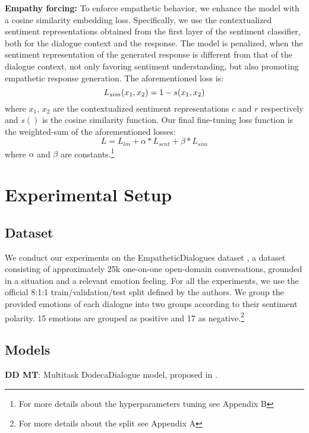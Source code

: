 \documentclass[11pt]{article}
\begin{document}
\textbf{Empathy forcing:} To enforce empathetic behavior, we enhance the model with a cosine similarity embedding loss. Specifically, we use the contextualized sentiment representations obtained from the first layer of the sentiment classifier, both for the dialogue context and the response. The model is penalized, when the sentiment representation of the generated response is different from that of the dialogue context, not only favoring sentiment understanding, but also promoting empathetic response generation. The aforementioned loss is:
    \begin{equation}
    \centering
        L_{sim}(x_1,x_2) = 1-s(x_1,x_2)
    \end{equation}
    where $x_1$, $x_2$ are the contextualized sentiment representations $c$ and $r$ respectively and $s()$ is the cosine similarity function.
    \noindent
    Our final fine-tuning loss function is the weighted-sum of the aforementioned losses:
    \begin{equation}
    L = L_{lm}+\alpha*L_{sent}+\beta*L_{sim} 
    \end{equation}
    where $\alpha$ and $\beta$ are constants.\footnote{For more details about the hyperparameters tuning see Appendix B}

\section{Experimental Setup}\label{sec:ExpSetup}

\subsection{Dataset}\label{subsec:Dataset}

We conduct our experiments on the EmpatheticDialogues dataset \citep{rashkin_2018_empathetic_dataset}, a dataset consisting of approximately 25k one-on-one open-domain conversations, grounded in a situation and a relevant emotion feeling. For all the experiments, we use the official 8:1:1 train/validation/test split defined by the authors. We group the provided emotions of each dialogue into two groups according to their sentiment polarity. 15 emotions are grouped as positive and 17 as negative.\footnote{For more details about the  split see Appendix A} 

\subsection{Models}\label{subsec:Models}
\noindent \textbf{DD MT}: Multitask DodecaDialogue model, proposed in \cite{shuster_2019_dodeca_dialogues}.
\end{document}

